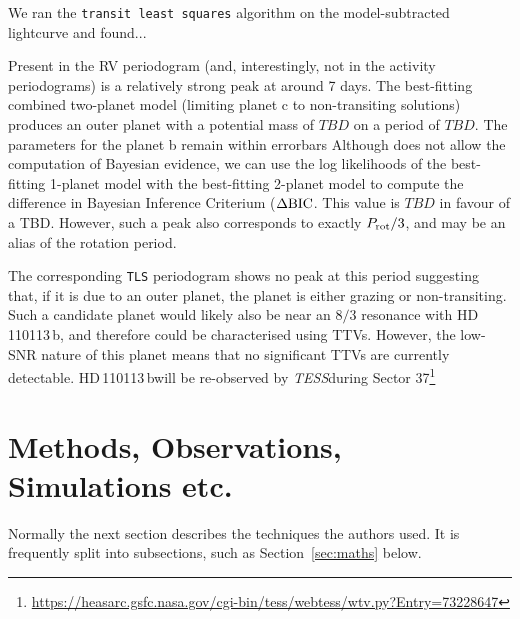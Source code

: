 \documentclass[fleqn,usenatbib]{mnras}
\newcommand{\tess}{{\it TESS}}
\newcommand{\Tplanet}{HD\,110113\,b}
\begin{document}
We ran the \texttt{transit least squares} algorithm \citep{heller} on the model-subtracted lightcurve and found...

Present in the RV periodogram (and, interestingly, not in the activity periodograms) is a relatively strong peak at around 7 days.
The best-fitting combined two-planet model (limiting planet c to non-transiting solutions) produces an outer planet with a potential mass of $TBD$ on a period of $TBD$.
The parameters for the planet b remain within errorbars 
Although \exoplanet does not allow the computation of Bayesian evidence, we can use the log likelihoods of the best-fitting 1-planet model with the best-fitting 2-planet model to compute the difference in Bayesian Inference Criterium ($\Delta{\rm BIC}$.
This value is $TBD$ in favour of a TBD.
However, such a peak also corresponds to exactly $P_{\rm rot}/3$, and may be an alias of the rotation period.

The corresponding \texttt{TLS} periodogram shows no peak at this period suggesting that, if it is due to an outer planet, the planet is either grazing or non-transiting.
Such a candidate planet would likely also be near an $8/3$ resonance with \Tplanet, and therefore could be characterised using TTVs. 
However, the low-SNR nature of this planet means that no significant TTVs are currently detectable.
\Tplanet will be re-observed by \tess during Sector 37\footnote{\url{https://heasarc.gsfc.nasa.gov/cgi-bin/tess/webtess/wtv.py?Entry=73228647}}

\section{Methods, Observations, Simulations etc.}

Normally the next section describes the techniques the authors used.
It is frequently split into subsections, such as Section~\ref{sec:maths} below.
\end{document}
